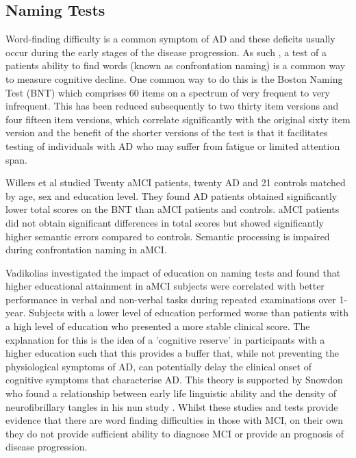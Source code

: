 \documentclass[10pt, letterpaper, twoside, openany]{book}
\begin{document}
\subsection{Naming Tests}
Word-finding difficulty is a common symptom of AD and these deficits usually occur during the early stages of the disease progression. As such , a test of a patients ability to find words (known as confrontation naming) is a common way to measure cognitive decline. One common way to do this is the Boston Naming Test (BNT) which comprises 60 items on a spectrum of very frequent to very infrequent. This has been reduced subsequently to two thirty item versions and four fifteen item versions, which correlate significantly with the original sixty item version and the benefit of the shorter versions of the test is that it facilitates testing of individuals with AD who may suffer from fatigue or limited attention span.
\par 
Willers et al \cite{Willers2008} studied Twenty aMCI patients, twenty AD and 21 controls matched by age, sex and education level. They found AD patients obtained significantly lower total scores on the BNT than aMCI patients and controls. aMCI patients did not obtain significant differences in total scores but showed significantly higher semantic errors compared to controls. Semantic processing is impaired during confrontation naming in aMCI.
\par 
Vadikolias investigated the impact of education on naming tests \cite{Vadikolias2012} and found that higher educational attainment in aMCI subjects were correlated with better performance in verbal and non-verbal tasks during repeated examinations over 1-year. Subjects with a lower level of education performed worse than patients with a high level of education who presented a more stable clinical score. The explanation for this is the idea of a 'cognitive reserve' in participants with a higher education such that this provides a buffer that, while not preventing the physiological symptoms of AD, can potentially delay the clinical onset of cognitive symptoms that characterise AD. This theory is supported by Snowdon who found a relationship between early life linguistic ability and the density of neurofibrillary tangles in his nun study \cite{Snowdon1996}. Whilst these studies and tests provide evidence that there are word finding difficulties in those with MCI, on their own they do not provide sufficient ability to diagnose MCI or provide an prognosis of disease progression.
\end{document}
